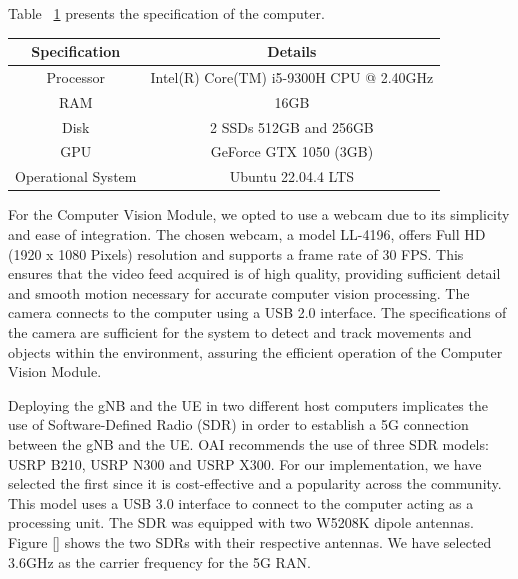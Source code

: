 Table ~\ref{tab:specs_pc} presents the specification of the computer.

\begin{table}[H]
    \begin{tabular}{|c|c|}
        \hline
        \textbf{Specification} & \textbf{Details} \\ \hline
        Processor                      &           Intel(R) Core(TM) i5-9300H CPU @ 2.40GHz   \\ \hline
        RAM                      &          16GB        \\ \hline
        Disk                      &   2 SSDs  512GB and 256GB         \\ \hline
        GPU                     &   GeForce GTX 1050 (3GB)      \\ \hline
        Operational System & Ubuntu 22.04.4 LTS                  \\ \hline
    \end{tabular}\label{tab:specs_pc}
\end{table}

For the Computer Vision Module, we opted to use a webcam due to its simplicity and ease of integration.
The chosen webcam, a model LL-4196, offers Full HD (1920 x 1080 Pixels) resolution and supports a frame rate of 30 FPS\@.
This ensures that the video feed acquired is of high quality, providing sufficient detail and smooth motion necessary for accurate computer vision processing.
The camera connects to the computer using a USB 2.0 interface.
The specifications of the camera are sufficient for the system to detect and track movements and objects within the environment, assuring the efficient operation of the Computer Vision Module.


Deploying the gNB and the UE in two different host computers implicates the use of Software-Defined Radio (SDR) in order to establish a 5G connection between the gNB and the UE.
OAI recommends the use of three SDR models: USRP B210, USRP N300 and USRP X300\@ \cite{}. %
For our implementation, we have selected the first since it is cost-effective and a popularity across the community.
This model uses a USB 3.0 interface to connect to the computer acting as a processing unit.
The SDR was equipped with two W5208K dipole antennas.
Figure \ref{} shows the two SDRs with their respective antennas.
We have selected 3.6GHz as the carrier frequency for the 5G RAN.

